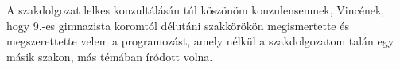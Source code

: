 \chapter*{\koszonetnyilvanitas}

A szakdolgozat lelkes konzultálásán túl köszönöm konzulensemnek, Vincének, hogy 9.-es gimnazista koromtól délutáni szakkörökön megismertette és megszerettette velem a programozást, amely nélkül a szakdolgozatom talán egy másik szakon, más témában íródott volna.